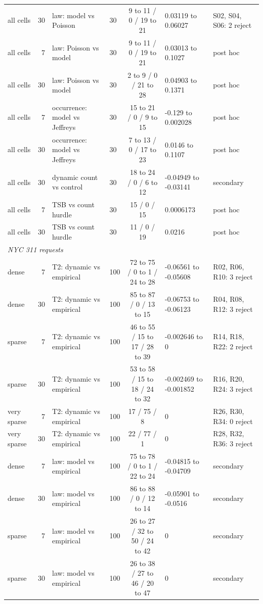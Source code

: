 \begin{table}[p]
\begin{tabular}{lrllcll}
all cells & 30 & law: model vs Poisson & 30 & 9 to 11 / 0 / 19 to 21 & 0.03119 to 0.06027 & S02, S04, S06: 2 reject \\
all cells & 7 & law: Poisson vs model & 30 & 9 to 11 / 0 / 19 to 21 & 0.03013 to 0.1027 & post hoc \\
all cells & 30 & law: Poisson vs model & 30 & 2 to 9 / 0 / 21 to 28 & 0.04903 to 0.1371 & post hoc \\
all cells & 7 & occurrence: model vs Jeffreys & 30 & 15 to 21 / 0 / 9 to 15 & -0.129 to 0.002028 & post hoc \\
all cells & 30 & occurrence: model vs Jeffreys & 30 & 7 to 13 / 0 / 17 to 23 & 0.0146 to 0.1107 & post hoc \\
all cells & 30 & dynamic count vs control & 30 & 18 to 24 / 0 / 6 to 12 & -0.04949 to -0.03141 & secondary \\
all cells & 7 & TSB vs count hurdle & 30 & 15 / 0 / 15 & 0.0006173 & post hoc \\
all cells & 30 & TSB vs count hurdle & 30 & 11 / 0 / 19 & 0.0216 & post hoc \\
\midrule
\multicolumn{7}{l}{\emph{NYC 311 requests}} \\
dense & 7 & T2: dynamic vs empirical & 100 & 72 to 75 / 0 to 1 / 24 to 28 & -0.06561 to -0.05608 & R02, R06, R10: 3 reject \\
dense & 30 & T2: dynamic vs empirical & 100 & 85 to 87 / 0 / 13 to 15 & -0.06753 to -0.06123 & R04, R08, R12: 3 reject \\
sparse & 7 & T2: dynamic vs empirical & 100 & 46 to 55 / 15 to 17 / 28 to 39 & -0.002646 to 0 & R14, R18, R22: 2 reject \\
sparse & 30 & T2: dynamic vs empirical & 100 & 53 to 58 / 15 to 18 / 24 to 32 & -0.002469 to -0.001852 & R16, R20, R24: 3 reject \\
very sparse & 7 & T2: dynamic vs empirical & 100 & 17 / 75 / 8 & 0 & R26, R30, R34: 0 reject \\
very sparse & 30 & T2: dynamic vs empirical & 100 & 22 / 77 / 1 & 0 & R28, R32, R36: 3 reject \\
dense & 7 & law: model vs empirical & 100 & 75 to 78 / 0 to 1 / 22 to 24 & -0.04815 to -0.04709 & secondary \\
dense & 30 & law: model vs empirical & 100 & 86 to 88 / 0 / 12 to 14 & -0.05901 to -0.0516 & secondary \\
sparse & 7 & law: model vs empirical & 100 & 26 to 27 / 32 to 50 / 24 to 42 & 0 & secondary \\
sparse & 30 & law: model vs empirical & 100 & 26 to 38 / 27 to 46 / 20 to 47 & 0 & secondary \\

\end{tabular}
\end{table}
